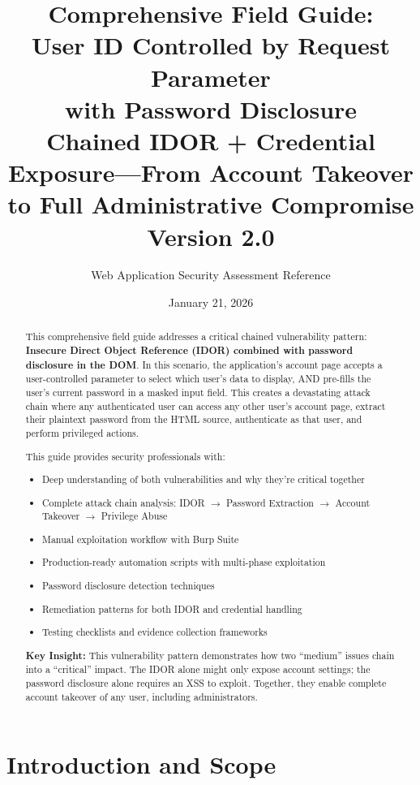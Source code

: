 \documentclass[11pt,letterpaper]{article}
\title{\textbf{Comprehensive Field Guide:\\User ID Controlled by Request Parameter\\with Password Disclosure}\\[0.5em]
\large Chained IDOR + Credential Exposure---From Account Takeover to Full Administrative Compromise\\[0.3em]
\normalsize Version 2.0}
\author{Web Application Security Assessment Reference}
\date{January 21, 2026}
\newcommand{\code}[1]{\texttt{\detokenize{#1}}}
\begin{document}
\maketitle

\begin{abstract}
\noindent This comprehensive field guide addresses a critical chained vulnerability pattern: \textbf{Insecure Direct Object Reference (IDOR) combined with password disclosure in the DOM}. In this scenario, the application's account page accepts a user-controlled \code{id} parameter to select which user's data to display, AND pre-fills the user's current password in a masked input field. This creates a devastating attack chain where any authenticated user can access any other user's account page, extract their plaintext password from the HTML source, authenticate as that user, and perform privileged actions.

This guide provides security professionals with:
\begin{itemize}
  \item Deep understanding of both vulnerabilities and why they're critical together
  \item Complete attack chain analysis: IDOR $\rightarrow$ Password Extraction $\rightarrow$ Account Takeover $\rightarrow$ Privilege Abuse
  \item Manual exploitation workflow with Burp Suite
  \item Production-ready automation scripts with multi-phase exploitation
  \item Password disclosure detection techniques
  \item Remediation patterns for both IDOR and credential handling
  \item Testing checklists and evidence collection frameworks
\end{itemize}

\noindent\textbf{Key Insight:} This vulnerability pattern demonstrates how two ``medium'' issues chain into a ``critical'' impact. The IDOR alone might only expose account settings; the password disclosure alone requires an XSS to exploit. Together, they enable complete account takeover of any user, including administrators.
\end{abstract}

\tableofcontents
\newpage

\section{Introduction and Scope}
\end{document}
